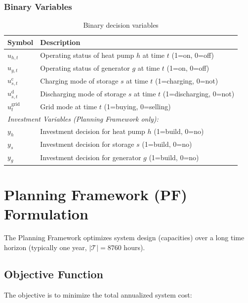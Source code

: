 \documentclass[11pt]{article}
\begin{document}
\subsubsection{Binary Variables}

\begin{table}[h]
\centering
\begin{tabular}{ll}
\toprule
\textbf{Symbol} & \textbf{Description} \\
\midrule
$u_{h,t}$ & Operating status of heat pump $h$ at time $t$ (1=on, 0=off) \\
$u_{g,t}$ & Operating status of generator $g$ at time $t$ (1=on, 0=off) \\
$u_{s,t}^{\text{c}}$ & Charging mode of storage $s$ at time $t$ (1=charging, 0=not) \\
$u_{s,t}^{\text{d}}$ & Discharging mode of storage $s$ at time $t$ (1=discharging, 0=not) \\
$u_t^{\text{grid}}$ & Grid mode at time $t$ (1=buying, 0=selling) \\
\midrule
\multicolumn{2}{l}{\textit{Investment Variables (Planning Framework only):}} \\
$y_h$ & Investment decision for heat pump $h$ (1=build, 0=no) \\
$y_s$ & Investment decision for storage $s$ (1=build, 0=no) \\
$y_g$ & Investment decision for generator $g$ (1=build, 0=no) \\
\bottomrule
\end{tabular}
\caption{Binary decision variables}
\label{tab:vars_binary}
\end{table}

\section{Planning Framework (PF) Formulation}

The Planning Framework optimizes system design (capacities) over a long time horizon (typically one year, $|\mathcal{T}| = 8760$ hours).

\subsection{Objective Function}

The objective is to minimize the total annualized system cost:
\end{document}
